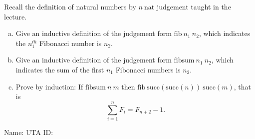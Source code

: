 \documentclass{article}
\newcommand{\answerboxsmall}{
    \vspace{3cm} %
}
\newcommand{\studentinfo}{
    \noindent Name: \underline{\hspace{5cm}} UTA ID: \underline{\hspace{5cm}}\\
    \vspace{0.5cm} %
}
\begin{document}
Recall the definition of natural numbers by $n\ \mbox{nat}$ judgement taught in the lecture.

\begin{enumerate}[(a)]
    \item Give an inductive definition of the judgement form
    $\mbox{fib}\ n_1\ n_2$, which indicates the $n_1^{th}$ Fibonacci number is $n_2$.
    \answerboxsmall

    \item Give an inductive definition of the judgement form
    $\mbox{fibsum}\ n_1\ n_2$, which indicates the sum of the first $n_1$ Fibonacci numbers is $n_2$.
    \answerboxsmall

    \item Prove by induction:
    If $\mbox{fibsum}\ n\ m$ then $\mbox{fib}\
    \mbox{succ}(\mbox{succ}(n))\ \mbox{succ}(m)$, that is
    $$\sum_{i=1}^n F_i = F_{n+2} - 1.$$
    \answerboxsmall

\end{enumerate}

\studentinfo
\end{document}

